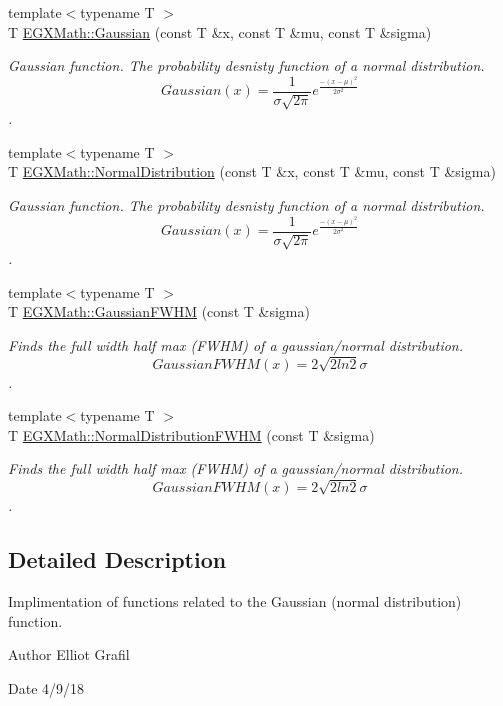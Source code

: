 \begin{DoxyCompactItemize}
\item 
{\footnotesize template$<$typename T $>$ }\\T \mbox{\hyperlink{group___e_g_x_math-_functions-_gaussian_ga647b46315081e299edc16a1c7f4e4032}{E\+G\+X\+Math\+::\+Gaussian}} (const T \&x, const T \&mu, const T \&sigma)
\begin{DoxyCompactList}\small\item\em Gaussian function. The probability desnisty function of a normal distribution. \[ Gaussian(x)=\frac{1}{\sigma \sqrt{2\pi}}e^{\frac{-(x-\mu)^2}{2\sigma^2}} \]. \end{DoxyCompactList}\item 
{\footnotesize template$<$typename T $>$ }\\T \mbox{\hyperlink{group___e_g_x_math-_functions-_gaussian_ga3747a7d047293d0e5310ba112bece627}{E\+G\+X\+Math\+::\+Normal\+Distribution}} (const T \&x, const T \&mu, const T \&sigma)
\begin{DoxyCompactList}\small\item\em Gaussian function. The probability desnisty function of a normal distribution. \[Gaussian(x)=\frac{1}{\sigma \sqrt{2\pi}}e^{\frac{-(x-\mu)^2}{2\sigma^2}}\]. \end{DoxyCompactList}\item 
{\footnotesize template$<$typename T $>$ }\\T \mbox{\hyperlink{group___e_g_x_math-_functions-_gaussian_ga0b8be7b82cb82e871a2613e6a7180431}{E\+G\+X\+Math\+::\+Gaussian\+F\+W\+HM}} (const T \&sigma)
\begin{DoxyCompactList}\small\item\em Finds the full width half max (F\+W\+HM) of a gaussian/normal distribution. \[GaussianFWHM(x)=2\sqrt{2 ln 2} \sigma \]. \end{DoxyCompactList}\item 
{\footnotesize template$<$typename T $>$ }\\T \mbox{\hyperlink{group___e_g_x_math-_functions-_gaussian_gac537b8c525932979b28101cf432bcc0f}{E\+G\+X\+Math\+::\+Normal\+Distribution\+F\+W\+HM}} (const T \&sigma)
\begin{DoxyCompactList}\small\item\em Finds the full width half max (F\+W\+HM) of a gaussian/normal distribution. \[GaussianFWHM(x)=2\sqrt{2 ln 2} \sigma \]. \end{DoxyCompactList}\end{DoxyCompactItemize}


\subsection{Detailed Description}
Implimentation of functions related to the Gaussian (normal distribution) function. 

\begin{DoxyAuthor}{Author}
Elliot Grafil 
\end{DoxyAuthor}
\begin{DoxyDate}{Date}
4/9/18 
\end{DoxyDate}
